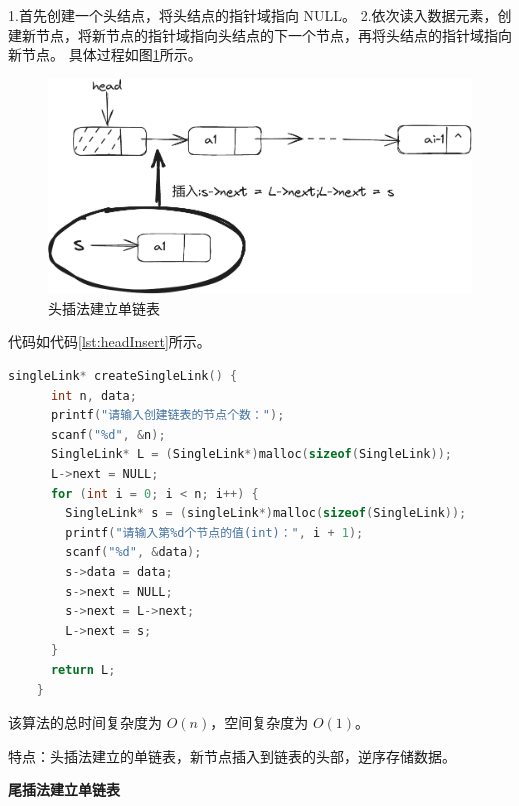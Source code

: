 \documentclass[lang=cn,newtx,10pt,scheme=chinese]{../elegantbook}
\begin{document}
  1.首先创建一个头结点，将头结点的指针域指向 NULL。
  2.依次读入数据元素，创建新节点，将新节点的指针域指向头结点的下一个节点，再将头结点的指针域指向新节点。
  具体过程如图\ref{fig:headInsert}所示。
  \begin{figure}[h]
    \centering
    \includegraphics[width=1\textwidth]{./figure/pdf/cropped/headInsert.pdf}
    \caption{头插法建立单链表}
    \label{fig:headInsert}
  \end{figure}
  代码如代码\ref{lst:headInsert}所示。
  \begin{lstlisting}[language=C++, caption={头插法建立单链表示例代码}, label={lst:headInsert}]
    singleLink* createSingleLink() {
      int n, data;
      printf("请输入创建链表的节点个数：");
      scanf("%d", &n);
      SingleLink* L = (SingleLink*)malloc(sizeof(SingleLink));
      L->next = NULL;
      for (int i = 0; i < n; i++) {
        SingleLink* s = (singleLink*)malloc(sizeof(SingleLink));
        printf("请输入第%d个节点的值(int)：", i + 1);
        scanf("%d", &data);
        s->data = data;
        s->next = NULL;
        s->next = L->next;
        L->next = s;
      }
      return L;
    }
    \end{lstlisting}
    该算法的总时间复杂度为 $O(n)$，空间复杂度为 $O(1)$。

    特点：头插法建立的单链表，新节点插入到链表的头部，逆序存储数据。

  \textbf{尾插法建立单链表}
\end{document}
